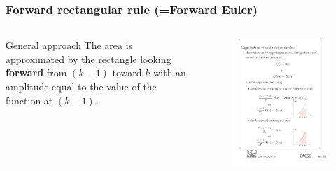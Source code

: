 \begin{frame}
	\frametitle{Forward rectangular rule (=Forward Euler)}
	\begin{columns}
		\begin{column}{0.5\textwidth}
		\begin{block}{General approach}
			The area is approximated by the rectangle looking \textbf{forward} from $(k-1)$ toward $k$ with an amplitude equal to the value of the function at $(k-1)$.
		\end{block}
		\end{column}
		\begin{column}{0.5\textwidth}
			\begin{figure}
				\centering
				\includegraphics[width=1\linewidth]{F_euler}
			\end{figure}
		\end{column}
	\end{columns}
\end{frame}

